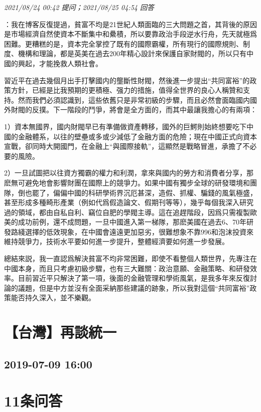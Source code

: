 \documentclass[twocolumn]{ctexart}
\begin{document}
\textit{\hfill\noindent\small 2021/08/24 00:42 提问；2021/08/25 04:54 回答}

：我在博客反復提過，貧富不均是21世紀人類面臨的三大問題之首，其背後的原因是市場經濟自然使資本不斷集中和纍積，所以要靠政治手段逆水行舟，先天就極爲困難。更糟糕的是，資本完全掌控了既有的國際霸權，所有現行的國際規則、制度、機構和理論，都是英美在過去200年精心設計來保護自家財閥的，所以只有中國的興起，才能挽救人類社會。

習近平在過去幾個月出手打擊國内的壟斷性財閥，然後進一步提出“共同富裕”的政策方針，已經是比我預期的更積極、强力的措施，值得全世界的良心人稱贊和支持。然而我們必須認識到，這些依舊只是非常初級的步驟，而且必然會面臨國内國外財閥的反撲。下一階段的鬥爭，將會是全方面的，而其中最讓我擔心的有兩項：

1）資本無國界，國内財閥早已有準備做資產轉移，國外的巨鰐則始終想要吃下中國的金融體系，以往的壁壘或多或少減低了金融方面的危險；現在中國正式向資本宣戰，卻同時大開國門，在金融上“與國際接軌”，這顯然是戰略冒進，承擔了不必要的風險。

2）一旦試圖把以往資方獨霸的權力和利潤，拿來與國内的勞方和消費者分享，那麽無可避免地會影響財團在國際上的競爭力。如果中國有獨步全球的研發環境和團隊，倒也罷了，偏偏中國的科研學術界沉厄甚深，造假、抓權、騙錢的風氣極盛，甚至形成多種畸形產業（例如代爲假造論文、假期刊等等），幾乎每個我深入研究過的領域，都由自私自利、竊位自肥的學閥主導。這在追趕階段，因爲只需複製歐美的成功前例，還不成問題，一旦中國進入第一梯隊，那麽美國在過去6、70年研發路綫選擇的低效現象，在中國會遠遠更加惡劣，很難想象不靠996和泡沫投資來維持競爭力，技術水平要如何進一步提升，整體經濟要如何進一步發展。

總結來説，我一直認爲解決貧富不均非常困難，即使不看整個人類世界，先專注在中國本身，而且只考慮初級步驟，也有三大難關：政治意願、金融策略、和研發效率。目前習近平只解決了第一項，後面的金融管理和學術風氣，是我多年來反復討論的議題，但是中方並沒有全面采納那些建議的跡象，所以我對這個“共同富裕”政策能否持久深入，並不樂觀。
\\


\section{【台灣】再談統一}
\subsection{2019-07-09 16:00}


\section{11条问答}
\end{document}
